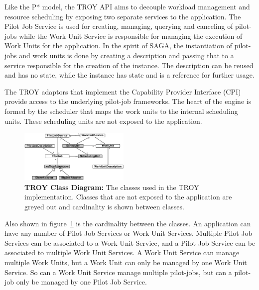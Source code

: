 \documentclass[conference,final]{IEEEtran}
\begin{document}
Like the P* model, the TROY API aims to
decouple workload management and resource scheduling by exposing two
separate services to the application.  The Pilot Job Service is used
for creating, managing, querying and canceling of pilot-jobs while the
Work Unit Service is responsible for managing the execution of Work
Units for the application. In the spirit of SAGA, the instantiation of
pilot-jobs and work units is done by creating a description and
passing that to a service responsible for the creation of the
instance. The description can be reused and has no state, while the
instance has state and is a reference for further usage.

The TROY adaptors that implement the Capability Provider Interface
(CPI) provide access to the underlying pilot-job frameworks. The heart
of the engine is formed by the scheduler that maps the work units to
the internal scheduling units. These scheduling units
are not exposed to the application.

\begin{figure}[t]
	\centering
		\includegraphics[width=0.47\textwidth]{figures/troy_classes.pdf}
                \caption{\textbf{TROY Class Diagram:} The classes used
                  in the TROY implementation. Classes that are not
                  exposed to the application are greyed out and
                  cardinality is shown between classes.  }
	\label{fig:figures_troy_classes}
\end{figure}

Also shown in figure~\ref{fig:figures_troy_classes} is the cardinality between
the classes. An application can have any number of Pilot Job Services or Work
Unit Services. Multiple Pilot Job Services can be associated to a Work Unit
Service, and a Pilot Job Service can be associated to multiple Work Unit
Services. A Work Unit Service can manage multiple Work Units, but a Work Unit
can only be managed by one Work Unit Service. So can a Work Unit Service manage
multiple pilot-jobs, but can a pilot-job only be managed by one Pilot Job
Service.
\end{document}
